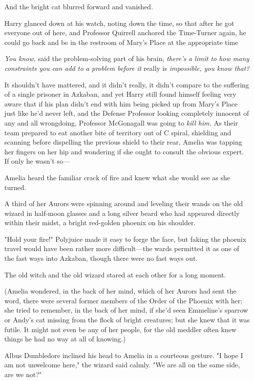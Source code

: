 And the bright cat blurred forward and vanished.

Harry glanced down at his watch, noting down the time, so that after he got
everyone out of here, and Professor Quirrell anchored the Time-Turner again, he
could go back and be in the restroom of Mary's Place at the appropriate
time{\el}

\emph{You know,} said the problem-solving part of his brain, \emph{there's a
limit to how many constraints you can add to a problem before it} really is
\emph{impossible, you know that?}

It shouldn't have mattered, and it didn't really, it didn't compare to the
suffering of a single prisoner in Azkaban, and yet Harry still found himself
feeling very aware that if his plan didn't end with him being picked up from
Mary's Place just like he'd never left, and the Defense Professor looking
completely innocent of any and all wrongdoing, Professor McGonagall was going
to \emph{kill him.}
\sbreak
As their team prepared to eat another bite of territory out of C spiral,
shielding and scanning before dispelling the previous shield to their rear,
Amelia was tapping her fingers on her hip and wondering if she ought to consult
the obvious expert. If only he wasn't so—

Amelia heard the familiar crack of fire and knew what she would see as she
turned.

A third of her Aurors were spinning around and leveling their wands on the old
wizard in half-moon glasses and a long silver beard who had appeared directly
within their midst, a bright red-golden phoenix on his shoulder.

"Hold your fire!" Polyjuice made it easy to forge the face, but faking the
phoenix travel would have been rather more difficult—the wards permitted it
as one of the fast ways into Azkaban, though there were no fast ways out.

The old witch and the old wizard stared at each other for a long moment.

(Amelia wondered, in the back of her mind, which of her Aurors had sent the
word, there were several former members of the Order of the Phoenix with her;
she tried to remember, in the back of her mind, if she'd seen Emmeline's
sparrow or Andy's cat missing from the flock of bright creatures; but she knew
that it was futile. It might not even be any of her people, for the old meddler
often knew things he had no way at all of knowing.)

Albus Dumbledore inclined his head to Amelia in a courteous gesture. "I hope I
am not unwelcome here," the wizard said calmly. "We are all on the same side,
are we not?"

